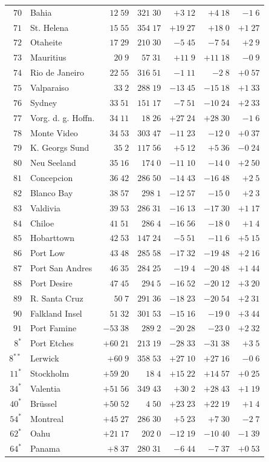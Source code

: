 \begin{center}
{{\begin{tabular}{r|l||r|r||r|r|r}
$70$&Bahia&$12\;59$&$321\;30$&$+3\;12$&$+4\;18$&$-1\;6$\\[2pt]
$71$&St. Helena&$15\;55$&$354\;17$&$+19\;27$&$+18\;0$&$+1\;27$\\
$72$&Otaheite&$17\;29$&$210\;30$&$-5\;45$&$-7\;54$&$+2\;9$\\
$73$&Mauritius&$20\;9$&$57\;31$&$+11\;9$&$+11\;18$&$-0\;9$\\
$74$&Rio de Janeiro&$22\;55$&$316\;51$&$-1\;11$&$-2\;8$&$+0\;57$\\
$75$&Valparaiso&$33\;2$&$288\;19$&$-13\;45$&$-15\;18$&$+1\;33$\\
$76$&Sydney&$33\;51$&$151\;17$&$-7\;51$&$-10\;24$&$+2\;33$\\
$77$&Vorg. d. g. Hoffn.&$34\;11$&$18\;26$&$+27\;24$&$+28\;30$&$-1\;6$\\
$78$&Monte Video&$34\;53$&$303\;47$&$-11\;23$&$-12\;0$&$+0\;37$\\
$79$&K. Georgs Sund&$35\;2$&$117\;56$&$+5\;12$&$+5\;36$&$-0\;24$\\
$80$&Neu Seeland&$35\;16$&$174\;0$&$-11\;10$&$-14\;0$&$+2\;50$\\[2pt]
$81$&Concepcion&$36\;42$&$286\;50$&$-14\;43$&$-16\;48$&$+2\;5$\\
$82$&Blanco Bay&$38\;57$&$298\;1$&$-12\;57$&$-15\;0$&$+2\;3$\\
$83$&Valdivia&$39\;53$&$286\;31$&$-16\;13$&$-17\;30$&$+1\;17$\\
$84$&Chiloe&$41\;51$&$286\;4$&$-16\;56$&$-18\;0$&$+1\;4$\\
$85$&Hobarttown&$42\;53$&$147\;24$&$-5\;51$&$-11\;6$&$+5\;15$\\
$86$&Port Low&$43\;48$&$285\;58$&$-17\;32$&$-19\;48$&$+2\;16$\\
$87$&Port San Andres&$46\;35$&$284\;25$&$-19\;4$&$-20\;48$&$+1\;44$\\
$88$&Port Desire&$47\;45$&$294\;5$&$-16\;52$&$-20\;12$&$+3\;20$\\
$89$&R. Santa Cruz&$50\;7$&$291\;36$&$-18\;23$&$-20\;54$&$+2\;31$\\
$90$&Falkland Insel&$51\;32$&$301\;53$&$-15\;16$&$-19\;0$&$+3\;44$\\[2pt]
$91$&Port Famine&$-53\;38$&$289\;2$&$-20\;28$&$-23\;0$&$+2\;32$\\[2pt]
$8^{\ast}$&Port Etches&$+60\;21$&$213\;19$&$-28\;33$&$-31\;38$&$+3\;5$\\
$8^{\ast\ast}$&Lerwick&$+60\;9$&$358\;53$&$+27\;10$&$+27\;16$&$-0\;6$\\
$11^{\ast}$&Stockholm&$+59\;20$&$18\;4$&$+15\;22$&$+14\;57$&$+0\;25$\\
$34^{\ast}$&Valentia&$+51\;56$&$349\;43$&$+30\;2$&$+28\;43$&$+1\;19$\\
$40^{\ast}$&Brüssel&$+50\;52$&$4\;50$&$+23\;23$&$+22\;19$&$+1\;4$\\
$54^{\ast}$&Montreal&$+45\;27$&$286\;30$&$+5\;23$&$+7\;30$&$-2\;7$\\
$62^{\ast}$&Oahu&$+21\;17$&$202\;0$&$-12\;19$&$-10\;40$&$-1\;39$\\
$64^{\ast}$&Panama&$+8\;37$&$280\;31$&$-6\;44$&$-7\;37$&$+0\;53$\\
\end{tabular}
}
}
\end{center}
